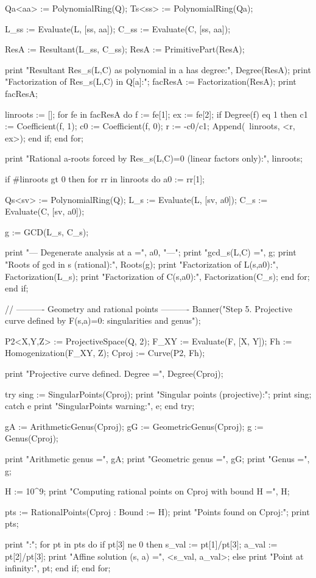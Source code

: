 \documentclass[12pt]{article}
\theoremstyle{remark}
\theoremstyle{definition}
\begin{document}
\begin{code}
Qa<aa> := PolynomialRing(Q);
Ts<ss> := PolynomialRing(Qa);

L_ss := Evaluate(L, [ss, aa]);
C_ss := Evaluate(C, [ss, aa]);

ResA := Resultant(L_ss, C_ss);
ResA := PrimitivePart(ResA);

print "Resultant Res_s(L,C) as polynomial in a has degree:", Degree(ResA);
print "Factorization of Res_s(L,C) in Q[a]:";
facResA := Factorization(ResA);
print facResA;

linroots := [];
for fe in facResA do
    f  := fe[1];
    ex := fe[2];
    if Degree(f) eq 1 then
        c1 := Coefficient(f, 1);
        c0 := Coefficient(f, 0);
        r  := -c0/c1;
        Append(~linroots, <r, ex>);
    end if;
end for;

print "Rational a-roots forced by Res_s(L,C)=0 (linear factors only):", linroots;

if #linroots gt 0 then
    for rr in linroots do
        a0 := rr[1];

        Qs<sv> := PolynomialRing(Q);
        L_s := Evaluate(L, [sv, a0]);
        C_s := Evaluate(C, [sv, a0]);

        g := GCD(L_s, C_s);

        print "\n--- Degenerate analysis at a =", a0, "---";
        print "gcd_s(L,C) =", g;
        print "Roots of gcd in s (rational):", Roots(g);
        print "Factorization of L(s,a0):", Factorization(L_s);
        print "Factorization of C(s,a0):", Factorization(C_s);
    end for;
end if;

// ---------- Geometry and rational points ----------
Banner("Step 5. Projective curve defined by F(s,a)=0: singularities and genus");

P2<X,Y,Z> := ProjectiveSpace(Q, 2);
F_XY := Evaluate(F, [X, Y]);
Fh := Homogenization(F_XY, Z);
Cproj := Curve(P2, Fh);

print "Projective curve defined. Degree =", Degree(Cproj);

try
    sing := SingularPoints(Cproj);
    print "Singular points (projective):";
    print sing;
catch e
    print "SingularPoints warning:", e;
end try;

gA := ArithmeticGenus(Cproj);
gG := GeometricGenus(Cproj);
g  := Genus(Cproj);

print "Arithmetic genus =", gA;
print "Geometric genus  =", gG;
print "Genus            =", g;

H := 10^9;
print "Computing rational points on Cproj with bound H =", H;

pts := RationalPoints(Cproj : Bound := H);
print "\nRational Points found on Cproj:";
print pts;

print "\nInterpretation:";
for pt in pts do
    if pt[3] ne 0 then
        s_val := pt[1]/pt[3];
        a_val := pt[2]/pt[3];
        print "Affine solution (s, a) =", <s_val, a_val>;
    else
        print "Point at infinity:", pt;
    end if;
end for;
\end{code}
\end{document}

